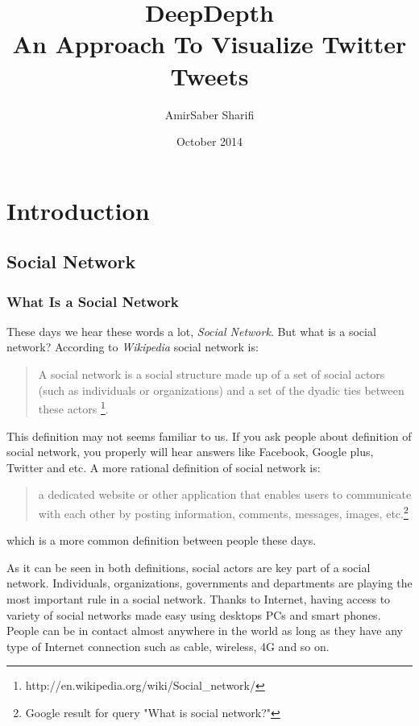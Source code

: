 \documentclass[a4paper,11pt]{report}
\title{DeepDepth \\ An Approach To Visualize Twitter Tweets}
\author{AmirSaber Sharifi}
\date{October 2014}
\begin{document}
\maketitle

\tableofcontents

\chapter{Introduction}

\section{Social Network}

\subsection{What Is a Social Network}

These days we hear these words a lot, \emph{Social Network}. But what is a social network? According to \emph{Wikipedia} social network is:

\begin{quote}

A social network is a social structure made up of a set of social actors (such as individuals or organizations) and a set of the dyadic ties between these actors
\footnote{http://en.wikipedia.org/wiki/Social\_network/}.

\end{quote}

This definition may not seems familiar to us. If you ask people about definition of social network, you properly will hear answers like Facebook, Google plus, Twitter and etc. A more rational definition of social network is:

\begin{quote}

a dedicated website or other application that enables users to communicate with each other by posting information, comments, messages, images, etc.\footnote{Google result for query "What is social network?"}

\end{quote}

which is a more common definition between people these days.

As it can be seen in both definitions, social actors are key part of a social network. Individuals, organizations, governments and departments are playing the most important rule in a social network. Thanks to Internet, having access to variety of social networks made easy using desktops PCs and smart phones. People can be in contact almost anywhere in the world as long as they have any type of Internet connection such as cable, wireless, 4G and so on.
\end{document}
